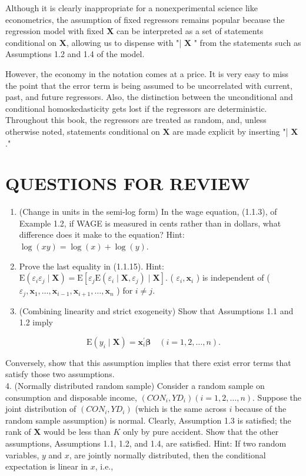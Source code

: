 \documentclass[10pt]{article}
\begin{document}
Although it is clearly inappropriate for a nonexperimental science like econometrics, the assumption of fixed regressors remains popular because the regression model with fixed $\mathbf{X}$ can be interpreted as a set of statements conditional on $\mathbf{X}$, allowing us to dispense with "| $\mathbf{X}$ " from the statements such as Assumptions 1.2 and 1.4 of the model.

However, the economy in the notation comes at a price. It is very easy to miss the point that the error term is being assumed to be uncorrelated with current, past, and future regressors. Also, the distinction between the unconditional and conditional homoskedasticity gets lost if the regressors are deterministic. Throughout this book, the regressors are treated as random, and, unless otherwise noted, statements conditional on $\mathbf{X}$ are made explicit by inserting "| $\mathbf{X}$."

\section*{QUESTIONS FOR REVIEW}
\begin{enumerate}
  \item (Change in units in the semi-log form) In the wage equation, (1.1.3), of Example 1.2, if WAGE is measured in cents rather than in dollars, what difference does it make to the equation? Hint: $\log (x y)=\log (x)+\log (y)$.
  \item Prove the last equality in (1.1.15). Hint: $\mathrm{E}\left(\varepsilon_{i} \varepsilon_{j} \mid \mathbf{X}\right)=\mathrm{E}\left[\varepsilon_{j} \mathrm{E}\left(\varepsilon_{i} \mid \mathbf{X}, \varepsilon_{j}\right) \mid \mathbf{X}\right]$. ( $\varepsilon_{i}, \mathbf{x}_{i}$ ) is independent of ( $\varepsilon_{j}, \mathbf{x}_{1}, \ldots, \mathbf{x}_{i-1}, \mathbf{x}_{i+1}, \ldots, \mathbf{x}_{n}$ ) for $i \neq j$.
  \item (Combining linearity and strict exogeneity) Show that Assumptions 1.1 and 1.2 imply
\end{enumerate}


\begin{equation*}
\mathrm{E}\left(y_{i} \mid \mathbf{X}\right)=\mathbf{x}_{i}^{\prime} \boldsymbol{\beta} \quad(i=1,2, \ldots, n) . \tag{1.1.20}
\end{equation*}


Conversely, show that this assumption implies that there exist error terms that satisfy those two assumptions.\\
4. (Normally distributed random sample) Consider a random sample on consumption and disposable income, $\left(C O N_{i}, Y D_{i}\right)(i=1,2, \ldots, n)$. Suppose the joint distribution of $\left(C O N_{i}, Y D_{i}\right)$ (which is the same across $i$ because of the random sample assumption) is normal. Clearly, Assumption 1.3 is satisfied; the rank of $\mathbf{X}$ would be less than $K$ only by pure accident. Show that the other assumptions, Assumptions 1.1, 1.2, and 1.4, are satisfied. Hint: If two random variables, $y$ and $x$, are jointly normally distributed, then the conditional expectation is linear in $x$, i.e.,
\end{document}

